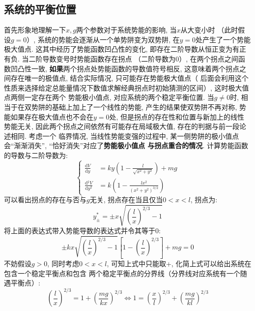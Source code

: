 \documentclass[a4paper,zihao=5,UTF8]{ctexart}
\def\d{\mathrm{d}}
\newcommand{\dv}[2]{\frac{\d{#1}}{\d{#2}}}
\begin{document}
    \subsection{系统的平衡位置}
    首先形象地理解一下$x, g$两个参数对于系统势能的影响, 当$x$从大变小时
    （此时假设$g=0$）, 系统的势能会逐渐从一个单势阱变为双势阱, 在$y=0$处产生了一个势能极大值点. 
    这其中经历了势能函数凹凸性的变化, 即存在二阶导数从恒正变为有正有负. 当二阶导数变号时势能函数存在拐点
    （二阶导数为0）, 在两个拐点之间函数凹凸性一致, \textbf{如果}两个拐点处势能函数的导数值符号相反, 
    这意味着两个拐点之间存在唯一的极值点, 结合实际情况, 只可能存在势能极大值点（
    后面会利用这个性质来选择给定总能量情况下数值求解经典拐点时初始猜测的区间）, 这时极大值点两侧一定存在两个
    势能极小值点, 对应系统的两个稳定平衡位置. 当$g\neq 0$时, 相当于在双势阱的基础上加上了一个线性的势能, 
    产生的结果使双势阱不再对称, 势能如果存在极大值点也不会在$y=0$处, 但是拐点的存在性和位置与新加上的线性
    势能无关, 因此两个拐点之间依然有可能存在局域极大值, 存在的判据与前一段论述相同. 考虑一个
    临界情况, 当线性势能变强的过程中, 某一侧势阱的极小值点会“渐渐消失”, “恰好消失”对应了\textbf{势能极小值点
    与拐点重合的情况}. 计算势能函数的导数与二阶导数为:
    \begin{equation}
        \left\{
            \begin{aligned}
                \dv{V}{y} &= ky\left(1 - \frac{l}{\sqrt{x^2 + y^2}}\right) + mg\\
                \dv{^2V}{y^2} &= k\left(1 - \frac{lx^2}{(x^2 + y^2)^{3/2}}\right)
            \end{aligned}
        \right.
    \end{equation}
    可以看出拐点的存在与否与$g$无关, 拐点存在当且仅当$0 < x < l$, 拐点为:
    \begin{equation}
        y^*_{\pm} = \pm x\sqrt{\left(\frac{l}{x}\right)^{2/3} - 1}
    \end{equation}
    将上面的表达式带入势能导数的表达式并令其等于0:
    \begin{equation}
        \pm kx\sqrt{\left(\frac{l}{x}\right)^{2/3} - 1}\left[1 - \left(\frac{l}{x}\right)^{2/3}\right] + mg = 0
    \end{equation}
    不妨假设$g>0$, 同时考虑$0 < x< l$, 可知上式中只能取+, 化简上式可以给出系统在包含一个稳定平衡点和包含
    两个稳定平衡点的分界线（分界线对应系统有一个随遇平衡点）:
    \begin{equation}
        \left(\frac{l}{x}\right)^{2/3} = 1 + \left(\frac{mg}{kx}\right)^{2/3}\Leftrightarrow 
        1 = \left(\frac{x}{l}\right)^{2/3} + \left(\frac{mg}{kl}\right)^{2/3}
        \label{boundary}
    \end{equation}
\end{document}
